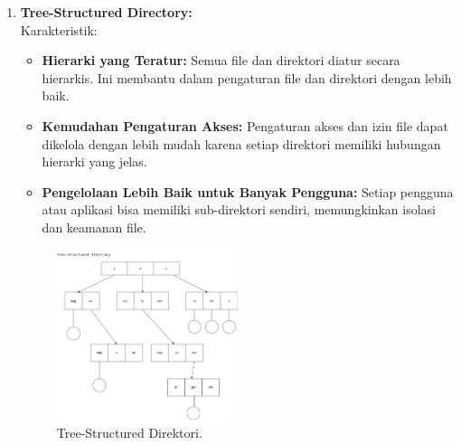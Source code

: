 \documentclass[12pt]{article}
\begin{document}
\begin{itemize}
\begin{enumerate}
\begin{enumerate}[label=\alph*.]
        \item \textbf{Tree-Structured Directory:} \\
        Karakteristik:
        \begin{itemize}
            \item \textbf{Hierarki yang Teratur:} Semua file dan direktori diatur secara hierarkis. Ini membantu dalam pengaturan file dan direktori dengan lebih baik.
            \item \textbf{Kemudahan Pengaturan Akses:} Pengaturan akses dan izin file dapat dikelola dengan lebih mudah karena setiap direktori memiliki hubungan hierarki yang jelas.
            \item \textbf{Pengelolaan Lebih Baik untuk Banyak Pengguna:} Setiap pengguna atau aplikasi bisa memiliki sub-direktori sendiri, memungkinkan isolasi dan keamanan file.
        \end{itemize}

        \begin{figure}[h]
        \centering
        \includegraphics[width=0.5\textwidth]{asset/gambar3.jpg}
        \caption{Tree-Structured Direktori.}
        \label{fig:tree-structured-direktori}
        \end{figure}


\end{enumerate}
\end{enumerate}
\end{itemize}
\end{document}
